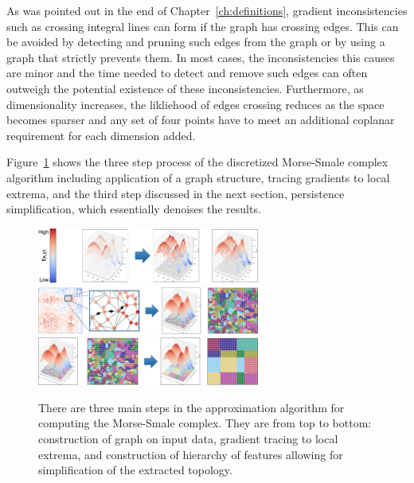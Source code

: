 As was pointed out in the end of Chapter~\ref{ch:definitions}, gradient inconsistencies such as crossing integral lines can form if the graph has crossing edges.
%
This can be avoided by detecting and pruning such edges from the graph or by using a graph that strictly prevents them.
%
In most cases, the inconsistencies this causes are minor and the time needed to detect and remove such edges can often outweigh the potential existence of these inconsistencies.
%
Furthermore, as dimensionality increases, the likliehood of edges crossing reduces as the space becomes sparser and any set of four points have to meet an additional coplanar requirement for each dimension added.
%

Figure~\ref{fig:mscAlgorithm} shows the three step process of the discretized Morse-Smale complex algorithm including application of a graph structure, tracing gradients to local extrema, and the third step discussed in the next section, persistence simplification, which essentially denoises the results.

\begin{figure}[!ht]
  \centering
  \includegraphics[width=0.65\textwidth]{figs/chap4/amscStep1}
  \includegraphics[width=0.65\textwidth]{figs/chap4/amscStep2}
  \includegraphics[width=0.65\textwidth]{figs/chap4/amscStep3}
  \caption[Illustration of the Morse-Smale Approximation algorithm for unstructured data]{There are three main steps in the approximation algorithm for computing the Morse-Smale complex. They are from top to bottom: construction of graph on input data, gradient tracing to local extrema, and construction of hierarchy of features allowing for simplification of the extracted topology.}
  \label{fig:mscAlgorithm}
\end{figure}

